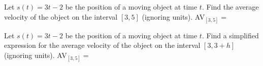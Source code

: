 \documentclass{ximera}
\begin{document}
\begin{question}
Let $s(t) = 3t - 2$ be the position of a moving object at time $t$.  Find the average velocity of the object on the interval $[3,5]$ (ignoring units).
AV$_{[3,5]}=$  

Let $s(t) = 3t - 2$ be the position of a moving object at time $t$.  Find a simplified expression for the average velocity of the object on the interval $[3,3+h]$
 (ignoring units).
AV$_{[3,5]}=$  
\end{question}
\end{document}
